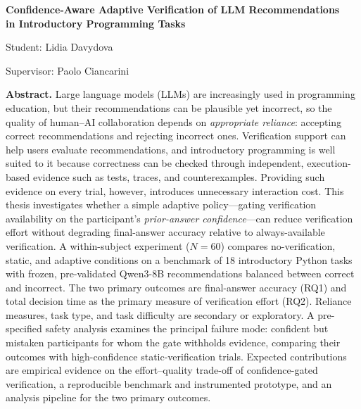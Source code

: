\documentclass[oneside,final,14pt,a4paper]{extreport}
\begin{document}
\begingroup
\setlength{\parindent}{0pt}
\setlength{\parskip}{0pt}

\begin{center}
    {\Large\bfseries
    Confidence-Aware Adaptive Verification of LLM Recommendations\\
    in Introductory Programming Tasks\par}
    \vspace{0.5em}
    {\normalsize Student: Lidia Davydova\par}
    \vspace{0.15em}
    {\normalsize Supervisor: Paolo Ciancarini\par}
\end{center}

\vspace{0.5em}

\begingroup
\small
\begin{minipage}{0.9\textwidth}
\noindent\textbf{Abstract.}
Large language models (LLMs) are increasingly used in programming
education, but their recommendations can be plausible yet incorrect,
so the quality of human--AI collaboration depends on
\emph{appropriate reliance}: accepting correct recommendations and
rejecting incorrect ones. Verification support can help users evaluate
recommendations, and introductory programming is well suited to it
because correctness can be checked through independent, execution-based
evidence such as tests, traces, and counterexamples. Providing such
evidence on every trial, however, introduces unnecessary interaction
cost. This thesis investigates whether a simple adaptive policy---gating
verification availability on the participant's \emph{prior-answer
confidence}---can reduce verification effort without degrading final-answer
accuracy relative to always-available verification. A within-subject
experiment ($N=60$) compares no-verification, static, and adaptive
conditions on a benchmark of 18 introductory Python tasks with frozen,
pre-validated Qwen3-8B recommendations balanced between correct and
incorrect. The two primary outcomes are final-answer accuracy (RQ1) and
total decision time as the primary measure of verification effort (RQ2).
Reliance measures, task type, and task difficulty are secondary or exploratory.
A pre-specified safety analysis examines the principal failure mode: confident
but mistaken participants for whom the gate withholds evidence, comparing their
outcomes with high-confidence static-verification trials. Expected contributions
are empirical evidence on the effort--quality trade-off of confidence-gated
verification, a reproducible benchmark and instrumented prototype, and an
analysis pipeline for the two primary outcomes.
\end{minipage}
\endgroup
\end{document}
